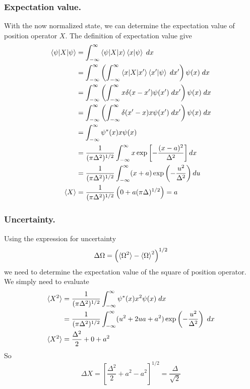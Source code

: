 \documentclass[../../../main.tex]{subfiles}
\begin{document}
\subsubsection{Expectation value.}
With the now normalized state, we can determine the expectation  value of position operator $X$.
The definition of expectation value give 
\begin{align*}
    \braket{\psi|X|\psi}&= \int_{-\infty}^{\infty} \braket{\psi|X|x}\braket{x|\psi}\;dx\\
    &= \int_{-\infty}^{\infty} \left(\int_{-\infty}^{\infty}  \braket{x|X|x'}\braket{x'|\psi}\;dx' \right)\psi(x)\;dx \\
    &= \int_{-\infty}^{\infty} \left(\int_{-\infty}^{\infty}  x\delta(x-x')\psi(x')\;dx' \right)\psi(x)\;dx \\
    &= \int_{-\infty}^{\infty} \left(\int_{-\infty}^{\infty}  \delta(x'-x)x\psi(x')\;dx' \right)\psi(x)\;dx \\
    &= \int_{-\infty}^{\infty} \psi ^*(x)x\psi(x) \\
    &= \frac{1 }{(\pi \Delta^2)^{1/2}}\int_{-\infty}^{\infty} x \exp\left[ -\frac{(x-a)^2}{\Delta^2} \right] dx\\
    &= \frac{1 }{(\pi\Delta^2)^{1/2}}\int_{-\infty}^{\infty} (x+a)\exp \left( -\frac{u^2 }{\Delta^2} \right) du\\
    \braket{X}&=\frac{1 }{(\pi\Delta^2)^{1/2}} \left( 0+a (\pi\Delta)^{1/2} \right) =a
\end{align*}

\subsubsection{Uncertainty.}
Using the expression for uncertainty
\begin{equation*}
    \Delta\Omega=\left( \braket{\Omega^2}-\braket{\Omega}^2 \right) ^{1/2}
\end{equation*}
we need to determine the expectation value of the square of position operator.
We simply need to evaluate
\begin{align*}
    \braket{X^2}&= \frac{1 }{(\pi\Delta^2)^{1/2}} \int_{-\infty}^{\infty} \psi ^*(x)x^2\psi(x)\;dx  \\
    &= \frac{1 }{(\pi\Delta^2)^{1/2}}\int_{-\infty}^{\infty} (u^2+2ua+a^2)\exp \left( -\frac{u ^2}{\Delta^2} \right)\;dx\\
    \braket{X^2}&= \frac{\Delta^2 }{2}+0+a^2 
\end{align*}
So 
\begin{equation*}
    \Delta X=\left[ \frac{\Delta^2}{2}+a^{2}-a^{2} \right]^{1/2}=\frac{\Delta}{\sqrt{2}} 
\end{equation*}
\end{document}
